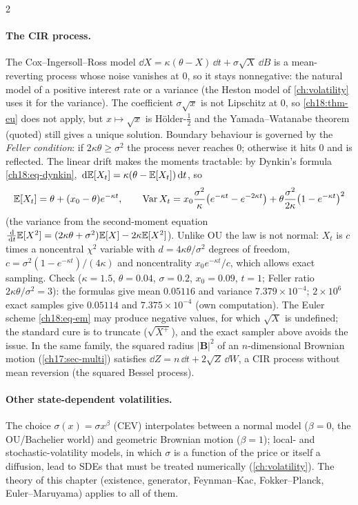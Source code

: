 \begin{paracol}{2}
\paragraph{The CIR process.} The Cox--Ingersoll--Ross model $\dd X=\kappa(\theta-X)\,\dd t+\sigma\sqrt X\,\dd B$ is a mean-reverting process whose noise vanishes at $0$, so it stays nonnegative: the natural model of a positive interest rate or a variance (the Heston model of \cref{ch:volatility} uses it for the variance). The coefficient $\sigma\sqrt x$ is not Lipschitz at $0$, so \cref{ch18:thm-eu} does not apply, but $x\mapsto\sqrt x$ is H\"older-$\tfrac12$ and the Yamada--Watanabe theorem (quoted) still gives a unique solution. Boundary behaviour is governed by the \emph{Feller condition}: if $2\kappa\theta\ge\sigma^2$ the process never reaches $0$; otherwise it hits $0$ and is reflected. The linear drift makes the moments tractable: by Dynkin's formula \eqref{ch18:eq-dynkin}, $\,\mathrm{d}\mathbb{E}[X_t]=\kappa(\theta-\mathbb{E}[X_t])\,\mathrm{d} t$, so
\[
  \mathbb{E}[X_t]=\theta+(x_0-\theta)e^{-\kappa t},\qquad
  \operatorname{Var} X_t=x_0\frac{\sigma^2}{\kappa}\bigl(e^{-\kappa t}-e^{-2\kappa t}\bigr)+\theta\frac{\sigma^2}{2\kappa}\bigl(1-e^{-\kappa t}\bigr)^2
\]
(the variance from the second-moment equation $\tfrac{\,\mathrm{d}}{\,\mathrm{d} t}\mathbb{E}[X^2]=(2\kappa\theta+\sigma^2)\mathbb{E}[X]-2\kappa\mathbb{E}[X^2]$). Unlike OU the law is not normal: $X_t$ is $c$ times a noncentral $\chi^2$ variable with $d=4\kappa\theta/\sigma^2$ degrees of freedom, $c=\sigma^2(1-e^{-\kappa t})/(4\kappa)$ and noncentrality $x_0e^{-\kappa t}/c$, which allows exact sampling. Check ($\kappa=1.5$, $\theta=0.04$, $\sigma=0.2$, $x_0=0.09$, $t=1$; Feller ratio $2\kappa\theta/\sigma^2=3$): the formulas give mean $0.05116$ and variance $7.379\times10^{-4}$; $2\times10^6$ exact samples give $0.05114$ and $7.375\times10^{-4}$ (own computation). The Euler scheme \eqref{ch18:eq-em} may produce negative values, for which $\sqrt X$ is undefined; the standard cure is to truncate ($\sqrt{X^+}$), and the exact sampler above avoids the issue. In the same family, the squared radius $|\bm B|^2$ of an $n$-dimensional Brownian motion (\cref{ch17:sec-multi}) satisfies $\dd Z=n\,\dd t+2\sqrt Z\,\dd W$, a CIR process without mean reversion (the squared Bessel process).

\paragraph{Other state-dependent volatilities.} The choice $\sigma(x)=\sigma x^{\beta}$ (CEV) interpolates between a normal model ($\beta=0$, the OU/Bachelier world) and geometric Brownian motion ($\beta=1$); local- and stochastic-volatility models, in which $\sigma$ is a function of the price or itself a diffusion, lead to SDEs that must be treated numerically (\cref{ch:volatility}). The theory of this chapter (existence, generator, Feynman--Kac, Fokker--Planck, Euler--Maruyama) applies to all of them.


\end{paracol}
